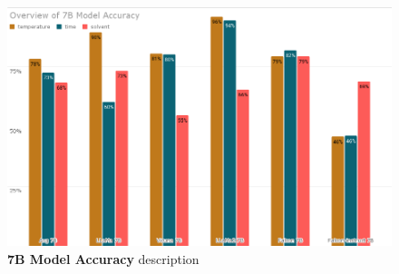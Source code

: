 \begin{figure}[!htbp]
    \begin{centering}
        \includegraphics[width=\textwidth]{img/overview_7b_accuracy}
        \caption[7B Model Accuracy]{\textbf{7B Model Accuracy} description
        }
        \label{fig:7b_acc}
    \end{centering}
\end{figure}

